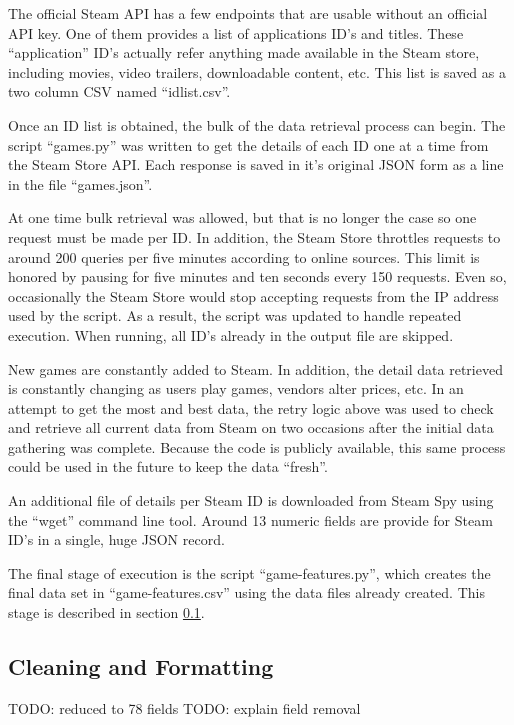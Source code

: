\documentclass[letterpaper,10pt,twocolumn]{article}
\begin{document}
The official Steam API has a few endpoints that are usable without an official
API key. One of them provides a list of applications ID's and titles. These
``application'' ID's actually refer anything made available in the Steam
store, including movies, video trailers, downloadable content, etc. This list
is saved as a two column CSV named ``idlist.csv''.

Once an ID list is obtained, the bulk of the data retrieval process can begin.
The script ``games.py'' was written to get the details of each ID one at a
time from the Steam Store API. Each response is saved in it's original JSON
form as a line in the file ``games.json''.

At one time bulk retrieval was allowed, but that is no longer the case so one
request must be made per ID. In addition, the Steam Store throttles requests
to around 200 queries per five minutes according to online sources. This limit
is honored by pausing for five minutes and ten seconds every 150 requests.
Even so, occasionally the Steam Store would stop accepting requests from the
IP address used by the script. As a result, the script was updated to handle
repeated execution. When running, all ID's already in the output file are
skipped.

New games are constantly added to Steam. In addition, the detail data
retrieved is constantly changing as users play games, vendors alter prices,
etc. In an attempt to get the most and best data, the retry logic above was
used to check and retrieve all current data from Steam on two occasions after
the initial data gathering was complete. Because the code is publicly
available, this same process could be used in the future to keep the data
``fresh''.

An additional file of details per Steam ID is downloaded from Steam Spy using
the ``wget'' command line tool. Around 13 numeric fields are provide for Steam
ID's in a single, huge JSON record.

The final stage of execution is the script ``game-features.py'', which creates
the final data set in ``game-features.csv'' using the data files already
created. This stage is described in section \ref{data-clean}.


\subsection{Cleaning and Formatting}

\label{data-clean}

TODO: reduced to 78 fields
TODO: explain field removal
\end{document}
